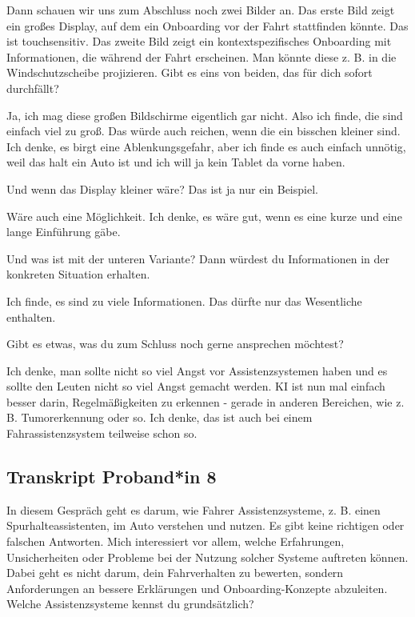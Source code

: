 \interviewerin
Dann schauen wir uns zum Abschluss noch zwei Bilder an. Das erste Bild
zeigt ein großes Display, auf dem ein Onboarding vor der Fahrt
stattfinden könnte. Das ist touchsensitiv. Das zweite Bild zeigt ein
kontextspezifisches Onboarding mit Informationen, die während der Fahrt
erscheinen. Man könnte diese z. B. in die Windschutzscheibe projizieren.
Gibt es eins von beiden, das für dich sofort durchfällt?

Ja, ich mag diese großen Bildschirme eigentlich gar nicht. Also ich
finde, die sind einfach viel zu groß. Das würde auch reichen, wenn die
ein bisschen kleiner sind. Ich denke, es birgt eine Ablenkungsgefahr,
aber ich finde es auch einfach unnötig, weil das halt ein Auto ist und
ich will ja kein Tablet da vorne haben.

\interviewerin
Und wenn das Display kleiner wäre? Das ist ja nur ein Beispiel.

Wäre auch eine Möglichkeit. Ich denke, es wäre gut, wenn es eine kurze
und eine lange Einführung gäbe.

\interviewerin
Und was ist mit der unteren Variante? Dann würdest du Informationen in
der konkreten Situation erhalten.

Ich finde, es sind zu viele Informationen. Das dürfte nur das
Wesentliche enthalten.

\interviewerin
Gibt es etwas, was du zum Schluss noch gerne ansprechen möchtest?

Ich denke, man sollte nicht so viel Angst vor Assistenzsystemen haben
und es sollte den Leuten nicht so viel Angst gemacht werden. KI ist nun
mal einfach besser darin, Regelmäßigkeiten zu erkennen - gerade in
anderen Bereichen, wie z. B. Tumorerkennung oder so. Ich denke, das ist
auch bei einem Fahrassistenzsystem teilweise schon so.



\clearpage
\subsection{Transkript Proband*in 8}
\label{subsec:transkript-p8}

\interviewerin
In diesem Gespräch geht es darum, wie Fahrer Assistenzsysteme, z. B.
einen Spurhalteassistenten, im Auto verstehen und nutzen. Es gibt keine
richtigen oder falschen Antworten. Mich interessiert vor allem, welche
Erfahrungen, Unsicherheiten oder Probleme bei der Nutzung solcher
Systeme auftreten können. Dabei geht es nicht darum, dein Fahrverhalten
zu bewerten, sondern Anforderungen an bessere Erklärungen und
Onboarding-Konzepte abzuleiten. Welche Assistenzsysteme kennst du
grundsätzlich?

